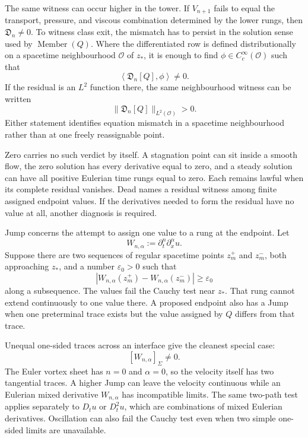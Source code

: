 The same witness can occur higher in the tower.
If \(V_{n+1}\) fails to equal the transport, pressure, and viscous combination determined by the lower rungs, then \(\mathfrak D_n\neq0\).
To witness class exit, the mismatch has to persist in the solution sense used by \(\operatorname{Member}(Q)\).
Where the differentiated row is defined distributionally on a spacetime neighbourhood \(\mathcal O\) of \(z_*\), it is enough to find \(\phi\in C_c^\infty(\mathcal O)\) such that
\[
  \left\langle
    \mathfrak D_n[Q],\phi
  \right\rangle
  \neq0.
\]
If the residual is an \(L^2\) function there, the same neighbourhood witness can be written
\[
  \|\mathfrak D_n[Q]\|_{L^2(\mathcal O)}>0.
\]
Either statement identifies equation mismatch in a spacetime neighbourhood rather than at one freely reassignable point.

Zero carries no such verdict by itself.
A stagnation point can sit inside a smooth flow, the zero solution has every derivative equal to zero, and a steady solution can have all positive Eulerian time rungs equal to zero.
Each remains lawful when its complete residual vanishes.
Dead names a residual witness among finite assigned endpoint values.
If the derivatives needed to form the residual have no value at all, another diagnosis is required.


Jump concerns the attempt to assign one value to a rung at the endpoint.
Let
\[
  W_{n,\alpha}
  :=
  \partial_t^n\partial_x^\alpha u.
\]
Suppose there are two sequences of regular spacetime points \(z_m^+\) and \(z_m^-\), both approaching \(z_*\), and a number \(\varepsilon_0>0\) such that
\[
  \left|
    W_{n,\alpha}(z_m^+)
    -
    W_{n,\alpha}(z_m^-)
  \right|
  \geq
  \varepsilon_0
\]
along a subsequence.
The values fail the Cauchy test near \(z_*\).
That rung cannot extend continuously to one value there.
A proposed endpoint also has a Jump when one preterminal trace exists but the value assigned by \(Q\) differs from that trace.

Unequal one-sided traces across an interface give the cleanest special case:
\[
  [W_{n,\alpha}]_\Sigma\neq0.
\]
The Euler vortex sheet has \(n=0\) and \(\alpha=0\), so the velocity itself has two tangential traces.
A higher Jump can leave the velocity continuous while an Eulerian mixed derivative \(W_{n,\alpha}\) has incompatible limits.
The same two-path test applies separately to \(D_tu\) or \(D_t^2u\), which are combinations of mixed Eulerian derivatives.
Oscillation can also fail the Cauchy test even when two simple one-sided limits are unavailable.

